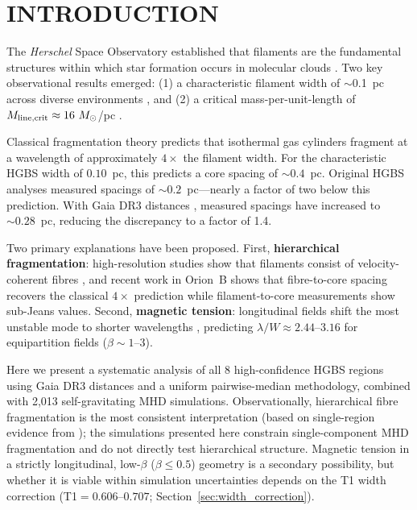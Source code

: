 \documentclass[twoside,twocolumn]{mnras}
\begin{document}
\section{INTRODUCTION}

The \textit{Herschel} Space Observatory established that filaments are the fundamental
structures within which star formation occurs in molecular clouds \citep{Andre2010}.
Two key observational results emerged: (1) a characteristic filament width of $\sim$0.1~pc
across diverse environments \citep{Arzoumanian2011}, and (2) a critical mass-per-unit-length
of $M_{\rm line,crit} \approx 16~M_\odot$/pc \citep{Ostriker1964}.

Classical fragmentation theory \citep{Inutsuka1992} predicts that isothermal gas cylinders
fragment at a wavelength of approximately $4\times$ the filament width. For the
characteristic HGBS width of $0.10$~pc, this predicts a core spacing of $\sim 0.4$~pc.
Original HGBS analyses measured spacings of $\sim 0.2$~pc---nearly a factor of two below
this prediction. With Gaia DR3 distances \citep{Zhang2023}, measured spacings have
increased to $\sim 0.28$~pc, reducing the discrepancy to a factor of 1.4.

Two primary explanations have been proposed. First, \textbf{hierarchical fragmentation}:
high-resolution studies show that filaments consist of velocity-coherent fibres
\citep{Hacar2013}, and recent work in Orion~B \citep{Yang2024} shows that fibre-to-core
spacing recovers the classical $4\times$ prediction while filament-to-core measurements
show sub-Jeans values. Second, \textbf{magnetic tension}: longitudinal fields shift the
most unstable mode to shorter wavelengths \citep{Nakamura1993}, predicting
$\lambda/W \approx 2.44$--$3.16$ for equipartition fields ($\beta \sim 1$--$3$).

Here we present a systematic analysis of all 8 high-confidence HGBS regions using Gaia DR3 distances and a uniform pairwise-median methodology, combined with 2,013 self-gravitating MHD simulations. Observationally, hierarchical fibre fragmentation is the most consistent interpretation (based on single-region evidence from \citealt{Yang2024}); the simulations presented here constrain single-component MHD fragmentation and do not directly test hierarchical structure. Magnetic tension in a strictly longitudinal, low-$\beta$ ($\beta \leq 0.5$) geometry is a secondary possibility, but whether it is viable within simulation uncertainties depends on the T1 width correction (T1$=0.606$--$0.707$; Section~\ref{sec:width_correction}).
\end{document}
